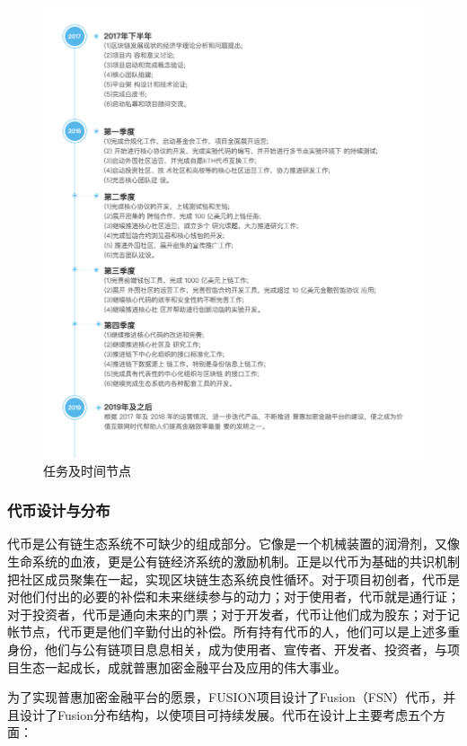 \documentclass[a4paper,12pt]{article}
\begin{document}
\begin{figure}[htbp]
\centering\includegraphics[width=6.6in]{pic_cn/timeline.png}
\caption{任务及时间节点}\label{fig:timeline}
\end{figure}

\subsubsection{代币设计与分布}

代币是公有链生态系统不可缺少的组成部分。它像是一个机械装置的润滑剂，又像生命系统的血液，更是公有链经济系统的激励机制。正是以代币为基础的共识机制把社区成员聚集在一起，实现区块链生态系统良性循环。对于项目初创者，代币是对他们付出的必要的补偿和未来继续参与的动力；对于使用者，代币就是通行证；对于投资者，代币是通向未来的门票；对于开发者，代币让他们成为股东；对于记帐节点，代币更是他们辛勤付出的补偿。所有持有代币的人，他们可以是上述多重身份，他们与公有链项目息息相关，成为使用者、宣传者、开发者、投资者，与项目生态一起成长，成就普惠加密金融平台及应用的伟大事业。

为了实现普惠加密金融平台的愿景，FUSION项目设计了Fusion（FSN）代币，并且设计了Fusion分布结构，以使项目可持续发展。代币在设计上主要考虑五个方面：
\end{document}
